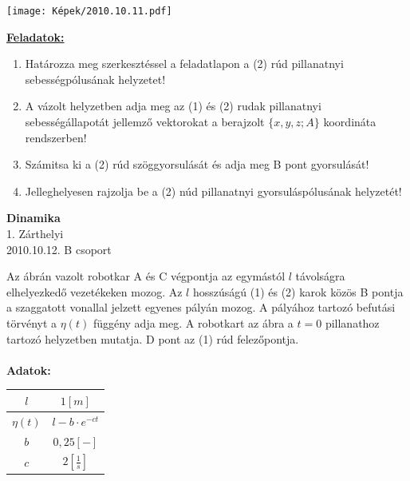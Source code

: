 \documentclass[11pt,a4paper]{article}
\begin{document}
\begin{center}
    \texttt{[image: Képek/2010.10.11.pdf]}
\end{center}

\vspace{2em}
\underline{\textbf{Feladatok:}}
\begin{enumerate}
    \item Határozza meg szerkesztéssel a feladatlapon a (2) rúd pillanatnyi sebességpólusának
    helyzetet!
    \item A vázolt helyzetben adja meg az (1) és (2) rudak pillanatnyi sebességállapotát jellemző
    vektorokat a berajzolt \(\{x,y,z; A\}\) koordináta rendszerben!
    \item Számitsa ki a (2) rúd szöggyorsulását és adja meg B pont gyorsulását!
    \item Jelleghelyesen rajzolja be a (2) núd pillanatnyi gyorsuláspólusának helyzetét!
\end{enumerate}
\newpage

\begin{center}
    \textbf{\LARGE{Dinamika}}\\
    1. Zárthelyi\\
    2010.10.12. B csoport
\end{center}
Az ábrán vazolt robotkar A és C végpontja az egymástól \(l\) távolságra elhelyezkedő vezetékeken mozog. Az \(l\) hosszúságú (1) és (2) karok közös B pontja a szaggatott vonallal jelzett egyenes pályán mozog. A pályához tartozó befutási törvényt a \(\eta(t)\) függény adja meg. A robotkart az ábra a \( t = 0\) pillanathoz tartozó helyzetben mutatja. D pont az (1) rúd felezőpontja.\\\\
\textbf{Adatok:}\\
\begin{tabular}{| c | c |}
    \hline
    $l $&$ 1 [m]$\\
    \hline
    $\eta(t)$ & $ l - b\cdot e^{-ct}$\\
    \hline
    $b $&$ 0,25 [-]$\\ 
    \hline
    $c $&$ 2 [\frac{1}{s}]$\\
    \hline
\end{tabular}
\end{document}
